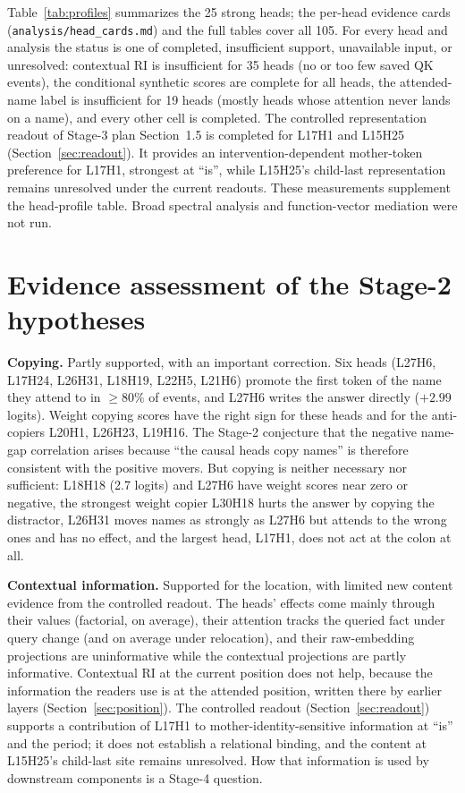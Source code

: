 \documentclass[11pt,a4paper]{article}
\begin{document}
Table~\ref{tab:profiles} summarizes the 25 strong heads; the per-head evidence cards
(\texttt{analysis/head\_cards.md}) and the full tables cover all 105. For every head
and analysis the status is one of completed, insufficient support, unavailable input,
or unresolved: contextual RI is insufficient for 35 heads (no or too few saved QK
events), the conditional synthetic scores are complete for all heads, the
attended-name label is insufficient for 19 heads (mostly heads whose attention never
lands on a name), and every other cell is completed.
The controlled representation readout of Stage-3 plan Section~1.5 is completed
for L17H1 and L15H25 (Section~\ref{sec:readout}). It provides an intervention-dependent
mother-token preference for L17H1, strongest at ``is'', while L15H25's child-last
representation remains unresolved under the current readouts. These measurements
supplement the head-profile table. Broad spectral analysis and function-vector
mediation were not run.

\section{Evidence assessment of the Stage-2 hypotheses}
\label{sec:hyp}
\textbf{Copying.} Partly supported, with an important correction. Six heads
(L27H6, L17H24, L26H31, L18H19, L22H5, L21H6) promote the first token of the name they
attend to in $\ge80\%$ of events, and L27H6 writes the answer directly ($+2.99$
logits).
Weight copying scores have the right sign for these heads and for the anti-copiers
L20H1, L26H23, L19H16. The Stage-2 conjecture that the negative name-gap correlation
arises because ``the causal heads copy names'' is therefore consistent with the
positive movers. But copying is neither necessary nor sufficient: L18H18 (2.7 logits)
and L27H6 have weight scores near zero or negative, the strongest weight copier L30H18
hurts the answer by copying the distractor, L26H31 moves names as strongly as L27H6 but
attends to the wrong ones and has no effect, and the largest head, L17H1, does not act
at the colon at all.

\textbf{Contextual information.} Supported for the location, with limited new
content evidence from the controlled readout.
The heads' effects come mainly through their values (factorial, on average), their
attention tracks the queried fact under query change (and on average under relocation),
and their raw-embedding projections
are uninformative while the contextual projections are partly informative. Contextual
RI at the current position does not help, because the information the readers use is
at the attended position, written there by earlier layers (Section~\ref{sec:position}).
The controlled readout (Section~\ref{sec:readout}) supports a contribution of L17H1
to mother-identity-sensitive information at ``is'' and the period; it does not
establish a relational binding, and the content at L15H25's child-last site remains
unresolved. How that information is used by downstream components is a Stage-4 question.
\end{document}
